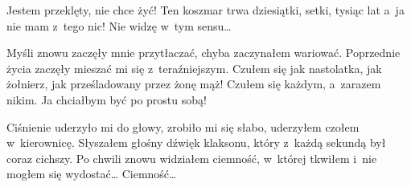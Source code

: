 Jestem przeklęty, nie chce żyć! Ten koszmar trwa dziesiątki, setki, tysiąc lat a~ja nie mam z~tego nic! Nie widzę w~tym sensu…

Myśli znowu zaczęły mnie przytłaczać, chyba zaczynałem wariować. Poprzednie życia zaczęły mieszać mi się z~teraźniejszym. Czułem się jak nastolatka, jak żołnierz, jak prześladowany przez żonę mąż! Czułem się każdym, a~zarazem nikim. Ja chciałbym być po prostu sobą!

Ciśnienie uderzyło mi do głowy, zrobiło mi się słabo, uderzyłem czołem w~kierownicę. Słyszałem głośny dźwięk klaksonu, który z~każdą sekundą był coraz cichszy. Po chwili znowu widziałem ciemność, w~której tkwiłem i~nie mogłem się wydostać… Ciemność…
